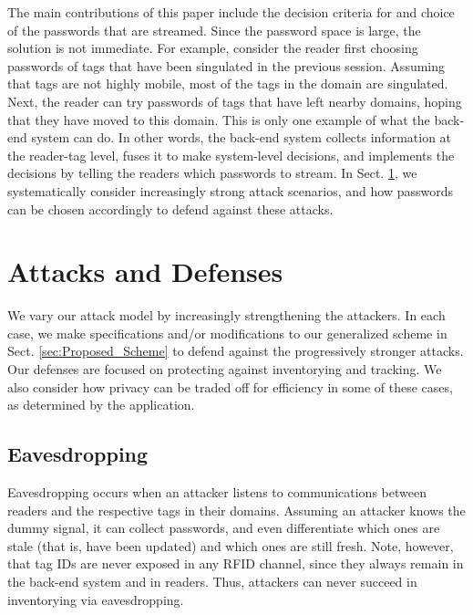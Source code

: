 The main contributions of this paper include the decision criteria for and choice of the passwords that are streamed.  Since the password space is large, the solution is not immediate.  For example, consider the reader first choosing passwords of tags that have been singulated in the previous session.  Assuming that tags are not highly mobile, most of the tags in the domain are singulated.  Next, the reader can try passwords of tags that have left nearby domains, hoping that they have moved to this domain.  This is only one example of what the back-end system can do.  In other words, the back-end system collects information at the reader-tag level, fuses it to make system-level decisions, and implements the decisions by telling the readers which passwords to stream.  In Sect. \ref{sec:Attacks_and_Defenses}, we systematically consider increasingly strong attack scenarios, and how passwords can be chosen accordingly to defend against these attacks.

\section{Attacks and Defenses}
\label{sec:Attacks_and_Defenses}
We vary our attack model by increasingly strengthening the attackers.  In each case, we make specifications and/or modifications to our generalized scheme in Sect. \ref{sec:Proposed_Scheme} to defend against the progressively stronger attacks.  Our defenses are focused on protecting against inventorying and tracking.  We also consider how privacy can be traded off for efficiency in some of these cases, as determined by the application.

\subsection{Eavesdropping}
\label{sec:Eavesdropping}
Eavesdropping occurs when an attacker listens to communications between readers and the respective tags in their domains.  Assuming an attacker knows the dummy signal, it can collect passwords, and even differentiate which ones are stale (that is, have been updated) and which ones are still fresh.  Note, however, that tag IDs are never exposed in any RFID channel, since they always remain in the back-end system and in readers.  Thus, attackers can never succeed in inventorying via eavesdropping.

